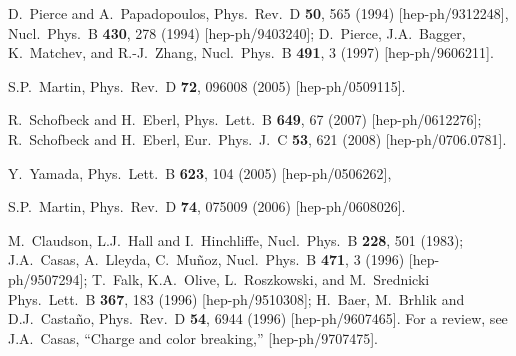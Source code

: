 \documentclass[12pt]{article}
\def\perspectives{in {\it Perspectives on Supersymmetry}, ed.
G.L.~Kane (World Scientific, 1998)}
\begin{document}
\begin{thebibliography}{999}
D.~Pierce and A.~Papadopoulos,
  Phys.\ Rev.\ D {\bf 50}, 565 (1994)
  [hep-ph/9312248],
  Nucl.\ Phys.\ B {\bf 430}, 278 (1994)
  [hep-ph/9403240];
D.~Pierce, J.A.~Bagger, K.~Matchev, and R.-J.~Zhang,
  Nucl.\ Phys.\ B {\bf 491}, 3 (1997)
  [hep-ph/9606211].

S.P.~Martin,
  Phys.\ Rev.\ D {\bf 72}, 096008 (2005)
  [hep-ph/0509115].

R.~Schofbeck and H.~Eberl,
  Phys.\ Lett.\  B {\bf 649}, 67 (2007)
  [hep-ph/0612276];
R.~Schofbeck and H.~Eberl,
  Eur.\ Phys.\ J.\  C {\bf 53}, 621 (2008)
  [hep-ph/0706.0781].

Y.~Yamada,
  Phys.\ Lett.\ B {\bf 623}, 104 (2005)
  [hep-ph/0506262],

  S.P.~Martin,
  Phys.\ Rev.\  D {\bf 74}, 075009 (2006)
  [hep-ph/0608026].
  
M.~Claudson, L.J.~Hall and I.~Hinchliffe, 
  Nucl.\ Phys.\ B {\bf 228}, 501 (1983);
J.A.~Casas, A.~Lleyda, C.~Mu\~noz, 
  Nucl.\ Phys.\ B {\bf 471}, 3 (1996)
  [hep-ph/9507294];
T.~Falk, K.A.~Olive, L.~Roszkowski, and M.~Srednicki
  Phys.\ Lett.\ B {\bf 367}, 183 (1996)
  [hep-ph/9510308];
H.~Baer, M.~Brhlik and D.J.~Casta\~no,
  Phys.\ Rev.\ D {\bf 54}, 6944 (1996)
  [hep-ph/9607465].
For a review, see 
J.A.~Casas,
  ``Charge and color breaking,''
  [hep-ph/9707475].


\end{thebibliography}
\end{document}
